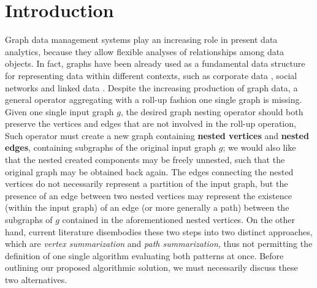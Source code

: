 
\section{Introduction}
Graph data management systems play an increasing role in present data analytics, because they allow flexible analyses of relationships among data objects. In fact, graphs have been already used as a fundamental data structure for representing data within different contexts, such as corporate data \cite{success,Park2016355}, social networks \cite{xie,BrodkaK14}  and linked data \cite{Vasilyeva13}. 
Despite the increasing production of graph data, a general operator aggregating with a roll-up fashion one single graph is missing. %
 Given one single input graph $g$, the desired graph nesting operator should both preserve the vertices and edges that are not involved in the roll-up operation, 
Such operator must create a new graph containing \textbf{nested vertices} and \textbf{nested edges}, containing subgraphs of the original input graph $g$; we would also like that the nested created components may be freely unnested, such that the original graph may be obtained back again. The edges connecting the nested vertices do not necessarily represent a partition of the input graph, but the presence of an edge between two nested vertices may represent the existence (within the input graph) of an edge (or more generally a path) between the subgraphs of $g$ contained in the aforementioned nested vertices. On the other hand,  current literature disembodies these two steps into two distinct approaches, which are \textit{vertex summarization} and \textit{path summarization}, thus not permitting the definition of one single algorithm evaluating both patterns at once. Before outlining our proposed algorithmic solution, we must necessarily discuss these two alternatives.


